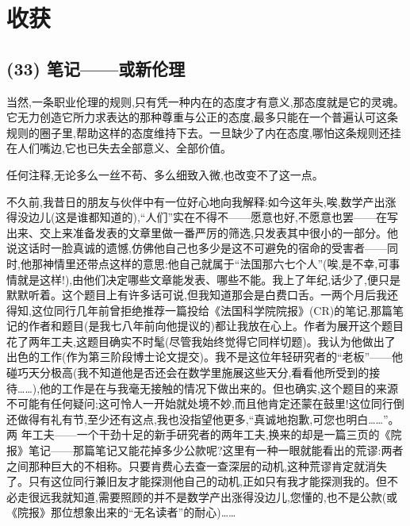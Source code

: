 \chapter{收获}

\section{(33) 笔记——或新伦理}

当然,一条职业伦理的规则,只有凭一种内在的态度才有意义,那态度就是它的灵魂。它无力创造它所力求表达的那种尊重与公正的态度,最多只能在一个普遍认可这条规则的圈子里,帮助这样的态度维持下去。一旦缺少了内在态度,哪怕这条规则还挂在人们嘴边,它也已失去全部意义、全部价值。

任何注释,无论多么一丝不苟、多么细致入微,也改变不了这一点。

不久前,我昔日的朋友与伙伴中有一位好心地向我解释:如今这年头,唉,数学产出涨得没边儿(这是谁都知道的),“人们”实在不得不——愿意也好,不愿意也罢——在写出来、交上来准备发表的文章里做一番严厉的筛选,只发表其中很小的一部分。他说这话时一脸真诚的遗憾,仿佛他自己也多少是这不可避免的宿命的受害者——同时,他那神情里还带点这样的意思:他自己就属于“法国那六七个人”(唉,是不幸,可事情就是这样!),由他们决定哪些文章能发表、哪些不能。我上了年纪,话少了,便只是默默听着。这个题目上有许多话可说,但我知道那会是白费口舌。一两个月后我还得知,这位同行几年前曾拒绝推荐一篇投给《法国科学院院报》(CR)的笔记,那篇笔记的作者和题目(是我七八年前向他提议的)都让我放在心上。作者为展开这个题目花了两年工夫,这题目确实不时髦(尽管我始终觉得它同样切题)。我认为他做出了出色的工作(作为第三阶段博士论文提交)。我不是这位年轻研究者的“老板”——他碰巧天分极高(我不知道他是否还会在数学里施展这些天分,看看他所受到的接待……),他的工作是在与我毫无接触的情况下做出来的。但也确实,这个题目的来源不可能有任何疑问;这可怜人一开始就处境不妙,而且他肯定还蒙在鼓里!这位同行倒还做得有礼有节,至少还有这点,我也没指望他更多,“真诚地抱歉,可您也明白……”。两%
年工夫——一个干劲十足的新手研究者的两年工夫,换来的却是一篇三页的《院报》笔记——那篇笔记又能花掉多少公款呢?这里有一种一眼就能看出的荒谬:两者之间那种巨大的不相称。只要肯费心去查一查深层的动机,这种荒谬肯定就消失了。只有这位同行兼旧友才能探测他自己的动机,正如只有我才能探测我的。但不必走很远我就知道,需要照顾的并不是数学产出涨得没边儿,您懂的,也不是公款(或《院报》那位想象出来的“无名读者”的耐心)……

